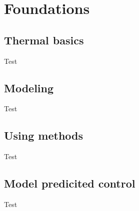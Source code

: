 \chapter{Foundations}
\label{ch:RW}

\section{Thermal basics}
Test
\section{Modeling}
Test
\section{Using methods}
Test
\section{Model predicited control}
Test

%
%



